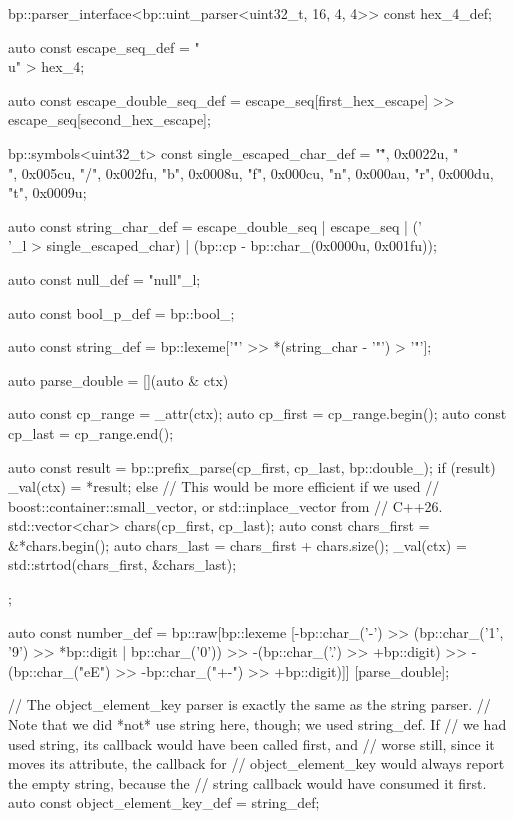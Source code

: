 \begin{code}
{    bp::parser_interface<bp::uint_parser<uint32_t, 16, 4, 4>> const hex_4_def;

    auto const escape_seq_def = "\\u" > hex_4;

    auto const escape_double_seq_def =
        escape_seq[first_hex_escape] >> escape_seq[second_hex_escape];

    bp::symbols<uint32_t> const single_escaped_char_def = {
        {"\"", 0x0022u},
        {"\\", 0x005cu},
        {"/", 0x002fu},
        {"b", 0x0008u},
        {"f", 0x000cu},
        {"n", 0x000au},
        {"r", 0x000du},
        {"t", 0x0009u}};

    auto const string_char_def = escape_double_seq | escape_seq |
                                 ('\\'_l > single_escaped_char) |
                                 (bp::cp - bp::char_(0x0000u, 0x001fu));

    auto const null_def = "null"_l;

    auto const bool_p_def = bp::bool_;

    auto const string_def = bp::lexeme['"' >> *(string_char - '"') > '"'];

    auto parse_double = [](auto & ctx) {
        auto const cp_range = _attr(ctx);
        auto cp_first = cp_range.begin();
        auto const cp_last = cp_range.end();

        auto const result = bp::prefix_parse(cp_first, cp_last, bp::double_);
        if (result) {
            _val(ctx) = *result;
        } else {
            // This would be more efficient if we used
            // boost::container::small_vector, or std::inplace_vector from
            // C++26.
            std::vector<char> chars(cp_first, cp_last);
            auto const chars_first = &*chars.begin();
            auto chars_last = chars_first + chars.size();
            _val(ctx) = std::strtod(chars_first, &chars_last);
        }
    };

    auto const number_def =
        bp::raw[bp::lexeme
                    [-bp::char_('-') >>
                     (bp::char_('1', '9') >> *bp::digit | bp::char_('0')) >>
                     -(bp::char_('.') >> +bp::digit) >>
                     -(bp::char_("eE") >> -bp::char_("+-") >> +bp::digit)]]
               [parse_double];

    // The object_element_key parser is exactly the same as the string parser.
    // Note that we did *not* use string here, though; we used string_def.  If
    // we had used string, its callback would have been called first, and
    // worse still, since it moves its attribute, the callback for
    // object_element_key would always report the empty string, because the
    // string callback would have consumed it first.
    auto const object_element_key_def = string_def;

}
\end{code}
